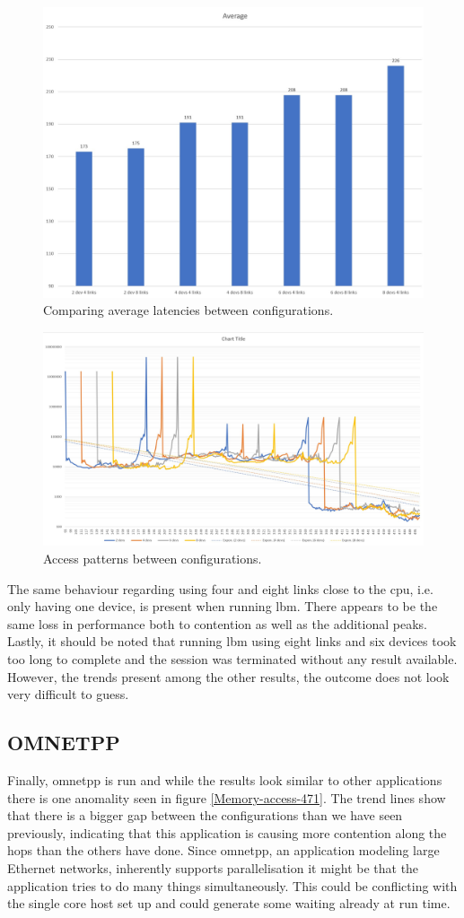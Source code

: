 \begin{figure}[!ht]
    \centering
    \includegraphics[width=0.75\linewidth]{figure/470-averages.jpg}
    \caption{Comparing average latencies between configurations.}
    \label{Memory-access-470-averages}
\end{figure}

\begin{figure}[!ht]
    \centering
    \includegraphics[width=0.75\linewidth]{figure/470-x_4.jpg}
    \caption{Access patterns between configurations.}
    \label{Memory-access-470}
\end{figure}

The same behaviour regarding using four and eight links close to the cpu, i.e. only having one device, is present when running lbm. There appears to be the same loss in performance both to contention as well as the additional peaks. Lastly, it should be noted that running lbm using eight links and six devices took too long to complete and the session was terminated without any result available. However, the trends present among the other results, the outcome does not look very difficult to guess.

\subsection{OMNETPP}
Finally, omnetpp is run and while the results look similar to other applications there is one anomality seen in figure \ref{Memory-access-471}. The trend lines show that there is a bigger gap between the configurations than we have seen previously, indicating that this application is causing more contention along the hops than the others have done. Since omnetpp, an application modeling large Ethernet networks, inherently supports parallelisation it might be that the application tries to do many things simultaneously. This could be conflicting with the single core host set up and could generate some waiting already at run time. 
\bigskip

